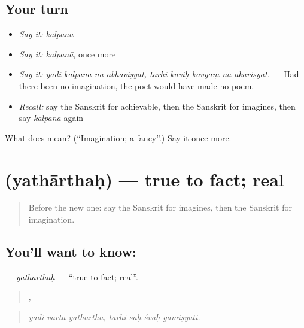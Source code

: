 \subsection*{Your turn}
\begin{itemize}
\raggedright
  \item \emph{Say it:} \emph{kalpanā}
  \item \emph{Say it:} \emph{kalpanā}, once more
  \item \emph{Say it:} \emph{yadi kalpanā na abhaviṣyat, tarhi kaviḥ kāvyaṃ na akariṣyat.} — Had there been no imagination, the poet would have made no poem.
  \item \emph{Recall:} say the Sanskrit for achievable, then the Sanskrit for imagines, then say \emph{kalpanā} again
\end{itemize}

\begin{tcolorbox}[breakable,colback=teal!4,colframe=teal!35!black,title={Before you move on}]
What does  mean? (\textquotedblleft{}Imagination; a fancy\textquotedblright{}.) Say it once more.
\end{tcolorbox}
\section[\texorpdfstring{\sk{यथार्थः} (yathārthaḥ)}{यथार्थः (yathārthaḥ)}]{ (yathārthaḥ) — true to fact; real}

\label{lesson:SA-C389-yatharthah}



\begin{quote}
Before the new one: say the Sanskrit for imagines, then the Sanskrit for imagination.
\end{quote}

\subsection*{You'll want to know: }
\textbf{} — \emph{yathārthaḥ} — \textquotedblleft{}true to fact; real\textquotedblright{}.

\begin{quote}
  ,    
\end{quote}

\begin{quote}
\emph{yadi vārtā yathārthā, tarhi saḥ śvaḥ gamiṣyati.}
\end{quote}

